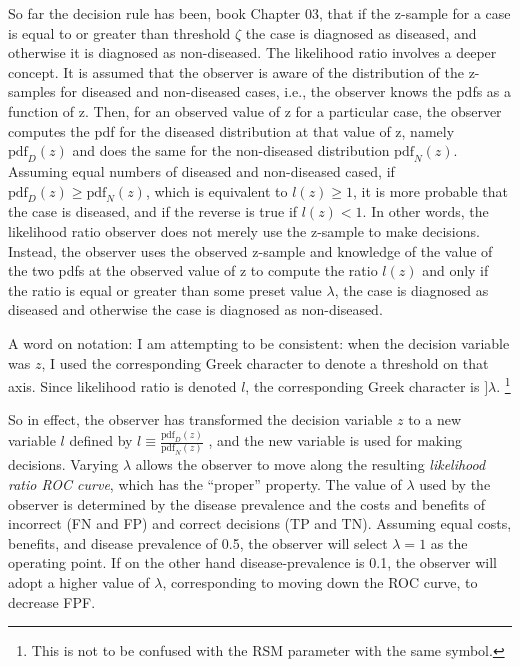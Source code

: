 \documentclass[
]{book}
\begin{document}
So far the decision rule has been, book Chapter 03, that if the z-sample for a case is equal to or greater than threshold \(\zeta\) the case is diagnosed as diseased, and otherwise it is diagnosed as non-diseased. The likelihood ratio involves a deeper concept. It is assumed that the observer is aware of the distribution of the z-samples for diseased and non-diseased cases, i.e., the observer knows the pdfs as a function of z. Then, for an observed value of z for a particular case, the observer computes the pdf for the diseased distribution at that value of z, namely \(\text{pdf}_D(z)\) and does the same for the non-diseased distribution \(\text{pdf}_N(z)\). Assuming equal numbers of diseased and non-diseased cased, if \(\text{pdf}_D\left( z \right) \ge \text{pdf}_N\left( z \right)\), which is equivalent to \(l(z) \ge 1\), it is more probable that the case is diseased, and if the reverse is true if \(l(z) < 1\). In other words, the likelihood ratio observer does not merely use the z-sample to make decisions. Instead, the observer uses the observed z-sample and knowledge of the value of the two pdfs at the observed value of z to compute the ratio \(l(z)\) and only if the ratio is equal or greater than some preset value \(\lambda\), the case is diagnosed as diseased and otherwise the case is diagnosed as non-diseased.

A word on notation: I am attempting to be consistent: when the decision variable was \(z\), I used the corresponding Greek character to denote a threshold on that axis. Since likelihood ratio is denoted \(l\), the corresponding Greek character is \(]\lambda\). \footnote{This is not to be confused with the RSM parameter with the same symbol.}

So in effect, the observer has transformed the decision variable \(z\) to a new variable \(l\) defined by \(l \equiv \frac{\text{pdf}_D\left( z \right)}{\text{pdf}_N\left( z \right)}\) , and the new variable is used for making decisions. Varying \(\lambda\) allows the observer to move along the resulting \emph{likelihood ratio ROC curve}, which has the ``proper'' property. The value of \(\lambda\) used by the observer is determined by the disease prevalence and the costs and benefits of incorrect (FN and FP) and correct decisions (TP and TN). Assuming equal costs, benefits, and disease prevalence of 0.5, the observer will select \(\lambda = 1\) as the operating point. If on the other hand disease-prevalence is 0.1, the observer will adopt a higher value of \(\lambda\), corresponding to moving down the ROC curve, to decrease FPF.
\end{document}
